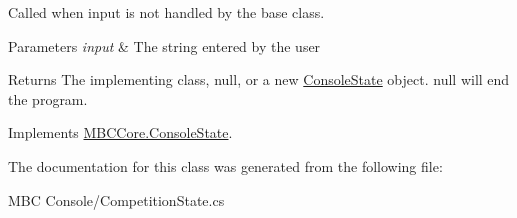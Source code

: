Called when input is not handled by the base class.


\begin{DoxyParams}{Parameters}
{\em input} & The string entered by the user\\
\hline
\end{DoxyParams}
\begin{DoxyReturn}{Returns}
The implementing class, null, or a new \hyperlink{class_m_b_c_core_1_1_console_state}{Console\-State} object. null will end the program.
\end{DoxyReturn}


Implements \hyperlink{class_m_b_c_core_1_1_console_state_a6eeffce4b7e3c7683bcc27e1baa2131b}{M\-B\-C\-Core.\-Console\-State}.



The documentation for this class was generated from the following file\-:\begin{DoxyCompactItemize}
\item 
M\-B\-C Console/Competition\-State.\-cs\end{DoxyCompactItemize}
